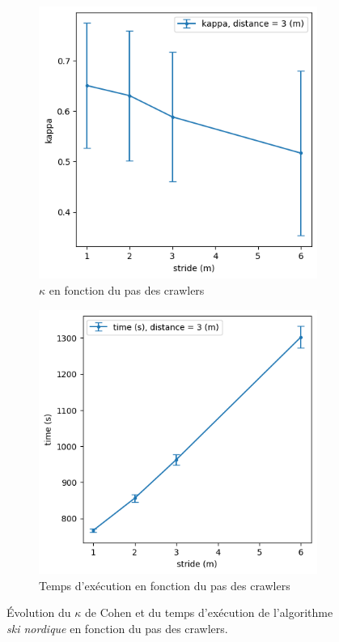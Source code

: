 \documentclass[francais,RandD]{rapportPFE}
\begin{document}
			\begin{figure}[h!]
				\begin{subfigure}[t]{0.49\linewidth}
					\includegraphics[width=\linewidth]{graphics/ski_nordique-kappa_vs_stride.png}
					\caption{$\kappa$ en fonction du pas des crawlers}
					\label{fig:ski_nordique-kappa_vs_stride}
				\end{subfigure}
				\hfill
				\begin{subfigure}[t]{0.49\linewidth}
						\includegraphics[width=\linewidth]{graphics/ski_nordique-time_vs_stride.png}
						\caption{Temps d'exécution en fonction du pas des crawlers}
						\label{fig:ski_nordique-time_vs_stride}
				\end{subfigure}
				\caption{Évolution du $\kappa$ de Cohen et du temps d'exécution de l'algorithme \textit{ski nordique} en fonction du pas des crawlers.}
				\label{fig:ski_nordique-stride}
			\end{figure}
\end{document}
